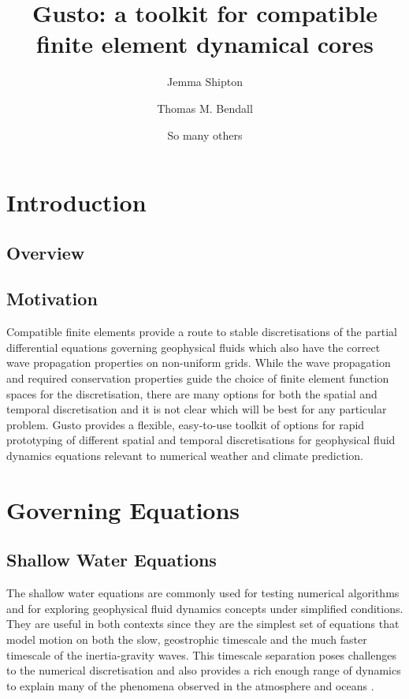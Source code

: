 \documentclass[11pt, a4paper]{article}
\begin{document}
\author[1,*]{Jemma Shipton}
\author[2]{Thomas M. Bendall}
\author[3]{So many others}


\title{Gusto: a toolkit for compatible finite element dynamical cores}
\date{}

\maketitle

\section{Introduction}

\subsection{Overview}

\subsection{Motivation}
Compatible finite elements provide a route to stable discretisations
of the partial differential equations governing geophysical fluids
which also have the correct wave propagation properties on non-uniform
grids. While the wave propagation and required conservation properties
guide the choice of finite element function spaces for the
discretisation, there are many options for both the spatial and
temporal discretisation and it is not clear which will be best for any
particular problem. Gusto provides a flexible, easy-to-use toolkit of
options for rapid prototyping of different spatial and temporal
discretisations for geophysical fluid dynamics equations relevant to
numerical weather and climate prediction.

\section{Governing Equations}

\subsection{Shallow Water Equations}
The shallow water equations are commonly used for testing numerical
algorithms and for exploring geophysical fluid dynamics concepts under
simplified conditions. They are useful in both contexts since they are
the simplest set of equations that model motion on both the slow,
geostrophic timescale and the much faster timescale of the
inertia-gravity waves. This timescale separation poses challenges to
the numerical discretisation and also provides a rich enough range of
dynamics to explain many of the phenomena observed in the atmosphere
and oceans \citep{zeitlin2018geophysical}.
\end{document}
